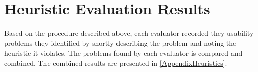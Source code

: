 \section{Heuristic Evaluation Results}
\label{Heuristic_Results}
Based on the procedure described above, each evaluator recorded they usability problems they identified by shortly describing the problem and noting the heuristic it violates. The problems found by each evaluator is compared and combined. The combined results are presented in \autoref{AppendixHeuristics}.






